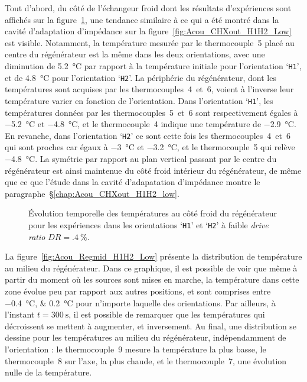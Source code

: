 Tout d'abord, du côté de l'échangeur froid dont les résultats d'expériences sont affichés sur la figure~\ref{fig:Acou_CHXin_H1H2_Low}, une tendance similaire à ce qui a été montré dans la cavité d'adaptation d'impédance sur la figure~\ref{fig:Acou_CHXout_H1H2_Low} est visible. Notamment, la température mesurée par le thermocouple~5 placé au centre du régénérateur est la même dans les deux orientations, avec une diminution de \qty{5.2}{\degreeCelsius} par rapport à la température initiale pour l'orientation `\texttt{H1}', et de \qty{4.8}{\degreeCelsius} pour l'orientation `\texttt{H2}'. La périphérie du régénérateur, dont les températures sont acquises par les thermocouples~4~et~6, voient à l'inverse leur température varier en fonction de l'orientation. Dans l'orientation `\texttt{H1}', les températures données par les thermocouples~5~et~6 sont respectivement égales à \qty{-5.2}{\degreeCelsius} et \qty{-4.8}{\degreeCelsius}, et le thermocouple~4 indique une température de \qty{-2.9}{\degreeCelsius}. En revanche, dans l'orientation `\texttt{H2}' ce sont cette fois les thermocouples~4~et~6 qui sont proches car égaux à \qty{-3}{\degreeCelsius} et \qty{-3.2}{\degreeCelsius}, et le thermocouple~5 qui relève \qty{-4.8}{\degreeCelsius}. La symétrie par rapport au plan vertical passant par le centre du régénérateur est ainsi maintenue du côté froid intérieur du régénérateur, de même que ce que l'étude dans la cavité d'adapatation d'impédance montre le paragraphe~§\ref{chap:Acou_CHXout_H1H2_low}.

\begin{figure}[!ht]
    \centering
    
    \caption{\'Evolution temporelle des températures au côté froid du régénérateur pour les expériences dans les orientations `\texttt{H1}' et `\texttt{H2}' à faible \textit{drive ratio} $DR=\qty{.4}{\percent}$.}
    \label{fig:Acou_CHXin_H1H2_Low}
\end{figure}

La figure~\ref{fig:Acou_Regmid_H1H2_Low} présente la distribution de température au milieu du régénérateur. Dans ce graphique, il est possible de voir que même à partir du moment où les sources sont mises en marche, la température dans cette zone évolue peu par rapport aux autres positions, et sont comprises entre \qtylist{-.4;.2}{\degreeCelsius} pour n'importe laquelle des orientations. Par ailleurs, à l'instant $t=\qty{300}{\second}$, il est possible de remarquer que les températures qui décroissent se mettent à augmenter, et inversement. Au final, une distribution se dessine pour les températures au milieu du régénérateur,  indépendamment de l'orientation : le thermocouple~9 mesure la température la plus basse, le thermocouple~8 sur l'axe, la plus chaude, et le thermocouple~7, une évolution nulle de la température. 

